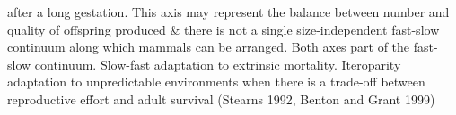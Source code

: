 after a long gestation. This axis may represent the balance between number and quality of offspring produced                                                                                                                                                                                                                                                                                                                                                                                                                                                                            & there is not a single size-independent fast-slow continuum along which mammals can be arranged. Both axes part of the fast-slow continuum. Slow-fast adaptation to extrinsic mortality. Iteroparity adaptation to unpredictable environments when there is a trade-off between reproductive effort and adult survival (Stearns 1992, Benton and Grant 1999)                                                                                                                                                                                                                                                                                                                                                                                                                                                                                                                                                                                                                                                                                                                                                                      \\
